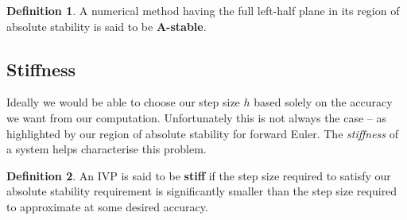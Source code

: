 \documentclass[12pt, twoside]{report}
\theoremstyle{plain}
\theoremstyle{definition}
\newtheorem{definition}{Definition}[chapter]
\theoremstyle{definition}
\begin{document}
            \begin{definition}
                A numerical method having the full left-half plane in its region of absolute stability is said to be \textbf{A-stable}.
            \end{definition} 


        \subsection{Stiffness}
        \label{2_stiffness}
            Ideally we would be able to choose our step size $h$ based solely
            on the accuracy we want from our computation. Unfortunately this is
            not always the case -- as highlighted by our region of absolute
            stability for forward Euler. The \textit{stiffness} of a system helps characterise this problem.

            \begin{definition}
                An IVP is said to be \textbf{stiff} if the step size required 
                to satisfy our absolute stability requirement is significantly smaller than the step size required to approximate at some desired accuracy.
            \end{definition}
\end{document}
